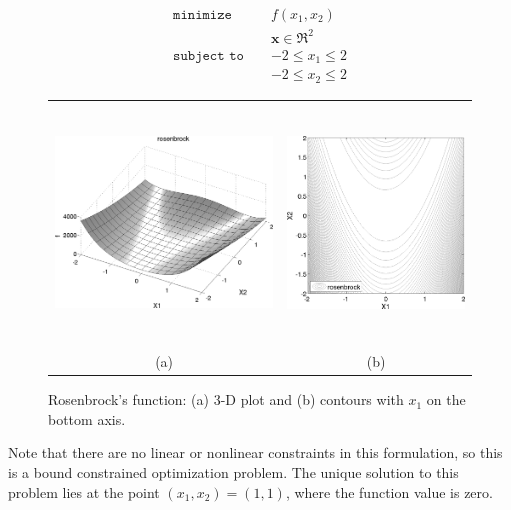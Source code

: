 \begin{eqnarray}
\texttt{minimize }   & & f(x_1,x_2)          \nonumber\\
                     & & \mathbf{x} \in \Re^2\nonumber\\
\texttt{subject to } & & -2 \le x_1 \le 2    \\
                     & & -2 \le x_2 \le 2    \nonumber
\end{eqnarray}

\begin{figure}[htp!]
  \centering
  \begin{tabular}{cc}
  \includegraphics[height=2.5in]{images/rosen_3d_surf} &
  \includegraphics[height=2.5in]{images/rosen_2d_surf} \\
  (a) & (b) \\
  \end{tabular}
  \caption{Rosenbrock's function: (a) 3-D plot and (b) contours with
  $x_1$ on the bottom axis.}
  \label{tutorial:rosenbrock_prob}
\end{figure}

Note that there are no linear or nonlinear constraints in this
formulation, so this is a bound constrained optimization problem. The
unique solution to this problem lies at the point
$(x_1,x_2) = (1,1)$, where the function value is zero.

